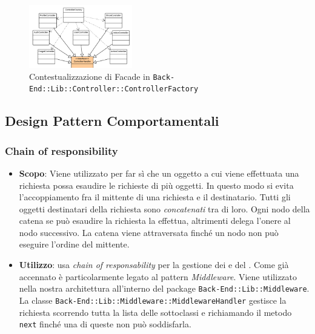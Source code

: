 \begin{figure}[H]
\centering \includegraphics[width=0.4\textwidth]{patterns/contestualizzazione/facade2.png}
\caption{Contestualizzazione di Facade in \texttt{Back-End::Lib::Controller::ControllerFactory}}
\label{fig:mvc}
\end{figure}

\subsection{Design Pattern Comportamentali}

\subsubsection{Chain of responsibility}
\label{chain-of-responsibility}

\begin{itemize}

	\item \textbf{Scopo}: Viene utilizzato per far sì che un oggetto a cui viene effettuata una richiesta possa esaudire le richieste di più oggetti. In questo modo si evita l'accoppiamento fra il mittente di una richiesta e il destinatario. Tutti gli oggetti destinatari della richiesta sono \textit{concatenati} tra di loro. Ogni nodo della catena se può esaudire la richiesta la effettua, altrimenti delega l'onere al nodo successivo. La catena viene attraversata finché un nodo non può eseguire l'ordine del mittente. 
	\item \textbf{Utilizzo}:  usa \textit{chain of responsability} per la gestione dei  e del . Come già accennato è particolarmente legato al pattern \textit{Middleware}. Viene utilizzato nella nostra architettura all'interno del package \texttt{Back-End::Lib::Middleware}. La classe \texttt{Back-End::Lib::Middleware::MiddlewareHandler} gestisce la richiesta scorrendo tutta la lista delle sottoclassi e richiamando il metodo \texttt{next} finché una di queste non può soddisfarla.

\end{itemize}

